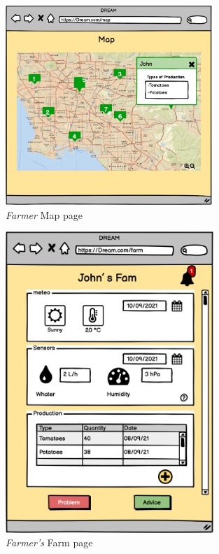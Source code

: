 \begin{figure}[H]
    \begin{center}
    \includegraphics[width=0.7\textwidth]{mockups/FMap.png}
    \caption{\emph{Farmer } Map page}
    \label{fig:farmerMap}
    \end{center}
\end{figure}

\begin{figure}[H]
    \begin{center}
    \includegraphics[width=0.7\textwidth]{mockups/FFarm.png}
    \caption{\emph{Farmer's} Farm page}
    \label{fig:FarmPage}
    \end{center}
\end{figure}

